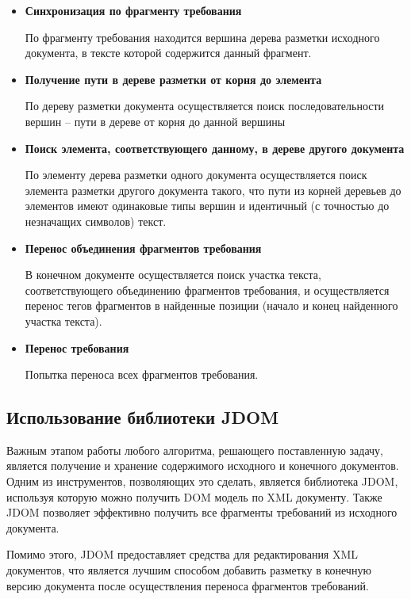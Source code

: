 \begin{itemize}
\item \textbf{Синхронизация по фрагменту требования}

По фрагменту требования находится вершина дерева разметки исходного документа, в тексте которой содержится данный фрагмент.

\item \textbf{Получение пути в дереве разметки от корня до элемента}

По дереву разметки документа осуществляется поиск последовательности вершин – пути в дереве от корня до данной вершины

\item \textbf{Поиск элемента, соответствующего данному, в дереве другого документа}

По элементу дерева разметки одного документа осуществляется поиск элемента разметки другого документа такого, что пути из корней деревьев до элементов имеют одинаковые типы вершин и идентичный (с точностью до незначащих символов) текст.

\item \textbf{Перенос объединения фрагментов требования}

В конечном документе осуществляется поиск участка текста, соответствующего объединению фрагментов требования, и осуществляется перенос тегов фрагментов в найденные позиции (начало и конец найденного участка текста).

\item \textbf{Перенос требования}

Попытка переноса всех фрагментов требования.

\end{itemize}

\subsection{Использование библиотеки JDOM}

Важным этапом работы любого алгоритма, решающего поставленную задачу, является получение и хранение содержимого исходного и конечного документов. Одним из инструментов, позволяющих это сделать, является библиотека JDOM, используя которую можно получить DOM модель по XML документу. Также JDOM позволяет эффективно получить все фрагменты требований из исходного документа.

Помимо этого, JDOM предоставляет средства для редактирования XML документов, что является лучшим способом добавить разметку в конечную версию документа после осуществления переноса  фрагментов требований.

